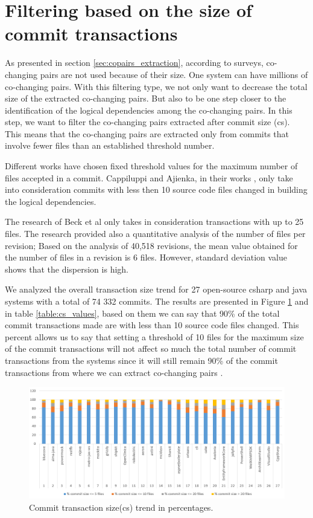 \documentclass[12pt, a4paper, twoside]{report}
\begin{document}
\section{Filtering based on the size of commit transactions}
\label{sec:filtercommit}

As presented in section \ref{sec:copairs_extraction}, according to surveys,  co-changing pairs are not used because of their size. One system can have millions of co-changing pairs.
With this filtering type, we not only want to decrease the total size of the extracted co-changing pairs. But also to be one step closer to the identification of the logical dependencies among the co-changing pairs.
In this step, we want to filter the co-changing pairs extracted after commit size (cs). This means that the co-changing pairs are extracted only from commits that involve fewer files than an established threshold number. 

Different works have chosen fixed threshold values for the maximum number of files accepted in a commit. Cappiluppi and Ajienka, in their works \cite{DBLP:journals/jss/AjienkaC17}, \cite{DBLP:journals/ese/AjienkaCC18} only take into consideration commits with less then 10 source code files changed in building the logical dependencies.

The research of Beck et al \cite{Beck:2011:CMC:2025113.2025162} only takes in consideration transactions with up to 25 files. The research \cite{Oliva:2011:ISL:2067853.2068086} provided also a quantitative analysis of the number of files per revision; Based on the analysis of 40,518 revisions, the mean value obtained for the number of files in a revision is 6 files. However, standard deviation value shows that the dispersion is high. 

We analyzed the overall transaction size trend for 27 open-source csharp and java systems with a total of 74 332 commits. The results are presented in Figure \ref{fig:fig_cs} and in table \ref{table:cs_values}, based on them we can say that 90\% of the total commit transactions made are with less than 10 source code files changed. This percent allows us to say that setting a threshold of 10 files for the maximum size of the commit transactions will not affect so much the total number of commit transactions from the systems since it will still remain 90\% of the commit transactions from where we can extract co-changing pairs \cite{DepSACI}.


\begin{figure}[!h]
\centering
\includegraphics[width=\textwidth]{commit_distribution.png}
\caption{Commit transaction size(cs) trend in percentages.}
\label{fig:fig_cs}
\centering
\end{figure}
\end{document}
